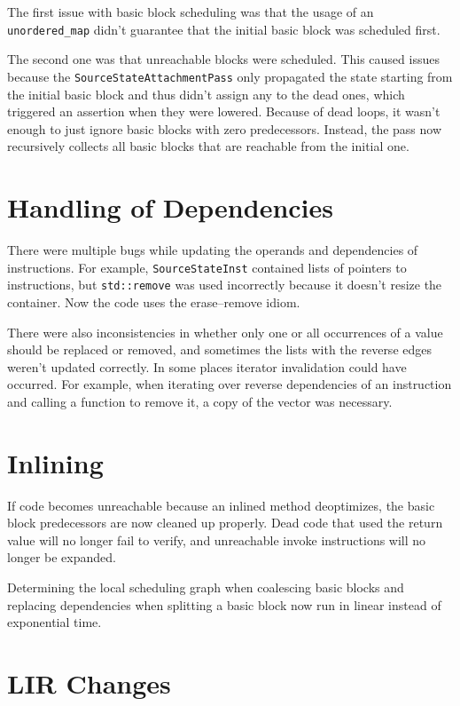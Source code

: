 \documentclass[draft,final]{vutinfth} %
\begin{document}
    The first issue with basic block scheduling was that
    the usage of an \lstinline{unordered_map} didn't guarantee that the initial basic block was scheduled first.

    The second one was that unreachable blocks were scheduled.
    This caused issues because the \lstinline{SourceStateAttachmentPass} only propagated the state starting from the initial basic block
    and thus didn't assign any to the dead ones,
    which triggered an assertion when they were lowered.
    Because of dead loops, it wasn't enough to just ignore basic blocks with zero predecessors.
    Instead, the pass now recursively collects all basic blocks that are reachable from the initial one.


    \section{Handling of Dependencies}

    There were multiple bugs while updating the operands and dependencies of instructions.
    For example, \lstinline{SourceStateInst} contained lists of pointers to instructions, but \lstinline{std::remove} was used incorrectly
    because it doesn't resize the container.
    Now the code uses the erase–remove idiom.

    There were also inconsistencies in whether only one or all occurrences of a value should be replaced or removed,
    and sometimes the lists with the reverse edges weren't updated correctly.
    In some places iterator invalidation could have occurred.
    For example, when iterating over reverse dependencies of an instruction and calling a function to remove it, a copy of the vector was necessary.


    \section{Inlining}

    If code becomes unreachable
    because an inlined method deoptimizes,
    the basic block predecessors are now cleaned up properly.
    Dead code that used the return value will no longer fail to verify,
    and unreachable invoke instructions will no longer be expanded.

    Determining the local scheduling graph when coalescing basic blocks
    and replacing dependencies when splitting a basic block
    now run in linear instead of exponential time.


    \section{LIR Changes}
\end{document}
